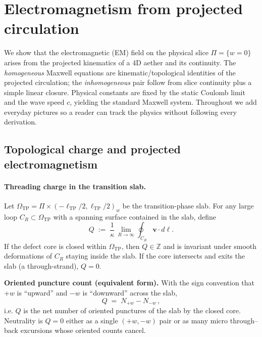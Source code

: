 \section{Electromagnetism from projected circulation}
\label{sec:EM_projection}

We show that the electromagnetic (EM) field on the physical slice $\Pi=\{w=0\}$ arises from the projected kinematics of a 4D aether and its continuity. The \emph{homogeneous} Maxwell equations are kinematic/topological identities of the projected circulation; the \emph{inhomogeneous} pair follow from slice continuity plus a simple linear closure. Physical constants are fixed by the static Coulomb limit and the wave speed $c$, yielding the standard Maxwell system. Throughout we add everyday pictures so a reader can track the physics without following every derivation.

\subsection{Topological charge and projected electromagnetism}
\label{sec:projected-em:charge}

\paragraph{Threading charge in the transition slab.}
Let $\Omega_{\mathrm{TP}}=\Pi\times(-\ell_{\mathrm{TP}}/2,\ell_{\mathrm{TP}}/2)_w$ be the transition-phase slab.
For any large loop $C_R\subset\Omega_{\mathrm{TP}}$ with a spanning surface contained in the slab, define
\begin{equation}
\label{eq:Q-threading}
Q \;:=\; \frac{1}{\kappa}\,\lim_{R\to\infty}\oint_{C_R}\mathbf v\cdot d\boldsymbol\ell.
\end{equation}
If the defect core is closed within $\Omega_{\mathrm{TP}}$, then $Q\in\mathbb Z$ and is invariant under smooth deformations of $C_R$ staying inside the slab. If the core intersects and exits the slab (a through-strand), $Q=0$.

\noindent\textbf{Oriented puncture count (equivalent form).}
With the sign convention that +$w$ is ``upward'' and −$w$ is ``downward'' across the slab,
\begin{equation}
Q \;=\; N_{+w}-N_{-w}\,,
\label{eq:Q-oriented-count}
\end{equation}
i.e. $Q$ is the net number of oriented punctures of the slab by the closed core. Neutrality is $Q{=}0$ either as a single $(+w,-w)$ pair or as many micro through--back excursions whose oriented counts cancel.

